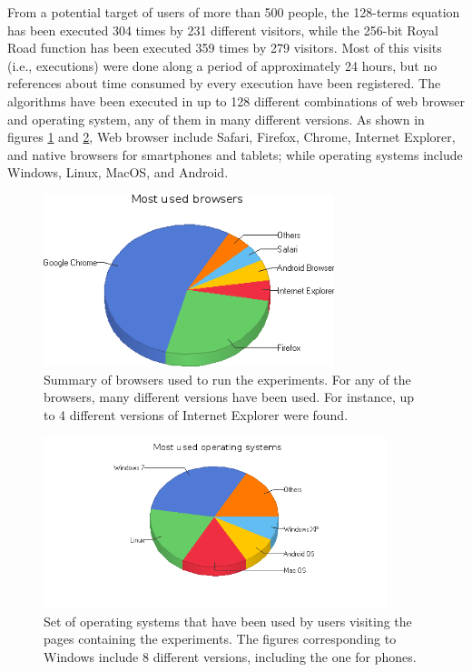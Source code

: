 \documentclass[runningheads,a4paper]{llncs}
\begin{document}
From a potential target of users of more than 500 people, the 128-terms equation has been executed 304 times by 231 different visitors, while the 256-bit Royal Road function has been executed 359 times by 279 visitors. Most of this visits (i.e., executions) were done along a period of approximately 24 hours, but no references about time consumed by every execution have been registered. The algorithms have been executed in up to 128 different combinations of web browser and operating system, any of them in many different versions. As shown in figures \ref{fig:browsers} and \ref{fig:operating-systems}, Web browser include Safari, Firefox, Chrome, Internet Explorer, and native browsers for smartphones and tablets; while operating systems include Windows, Linux, MacOS, and Android.

\begin{figure}
\centering
\includegraphics[height=5cm]{Most_Used_Browsers}
\caption{Summary of browsers used to run the experiments. For any of the browsers, many different versions have been used. For instance, up to 4 different versions of Internet Explorer were found.}
\label{fig:browsers}
\end{figure}


\begin{figure}
\centering
\includegraphics[height=5cm]{Most_Used_Operating_Systems}
\caption{Set of operating systems that have been used by users visiting the pages containing the experiments. The figures corresponding to Windows include 8 different versions, including the one for phones.
}
\label{fig:operating-systems}
\end{figure}
\end{document}
